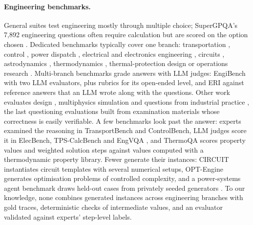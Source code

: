 \paragraph{Engineering benchmarks.}
General suites test engineering mostly through multiple choice; SuperGPQA's 7,892 engineering questions often require calculation but are scored on the option chosen \citep{du2025supergpqa}.
Dedicated benchmarks typically cover one branch: transportation \citep{syed2024transportbench}, control \citep{kevian2024controlbench}, power dispatch \citep{zhou2024elecbench}, electrical and electronics engineering \citep{li2025eeebench}, circuits \citep{skelic2025circuit}, astrodynamics \citep{wu2025apbench}, thermodynamics \citep{duzkar2026thermoqa}, thermal-protection design \citep{zheng2026tpscalcbench} or operations research \citep{mostajabdaveh2025orqa,chen2026optengine}.
Multi-branch benchmarks grade answers with LLM judges: EngiBench \citep{zhou2025engibench} with two LLM evaluators, plus rubrics for its open-ended level, and ERI \citep{naser2026eri} against reference answers that an LLM wrote along with the questions.
Other work evaluates design \citep{guo2025engdesign}, multiphysics simulation \citep{mudur2025feabench} and questions from industrial practice \citep{heesch2025realworld}, the last questioning evaluations built from examination materials whose correctness is easily verifiable.
A few benchmarks look past the answer: experts examined the reasoning in TransportBench and ControlBench, LLM judges score it in ElecBench, TPS-CalcBench and EngVQA \citep{wasiq2026engvqa}, and ThermoQA scores property values and weighted solution steps against values computed with a thermodynamic property library.
Fewer generate their instances: CIRCUIT instantiates circuit templates with several numerical setups, OPT-Engine \citep{chen2026optengine} generates optimisation problems of controlled complexity, and a power-systems agent benchmark draws held-out cases from privately seeded generators \citep{trashchenkov2026psab}.
To our knowledge, none combines generated instances across engineering branches with gold traces, deterministic checks of intermediate values, and an evaluator validated against experts' step-level labels.

